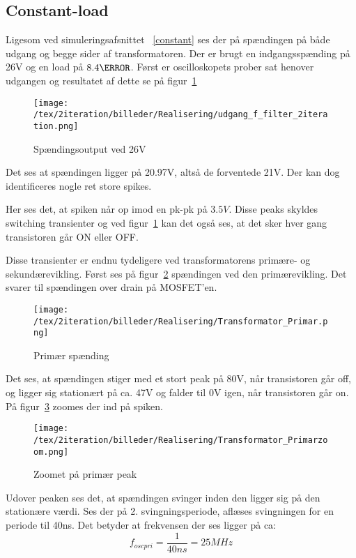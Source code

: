 
\subsection{Constant-load}
\noindent Ligesom ved simuleringsafsnittet ~\ref{constant} ses der på spændingen på både udgang og begge sider af transformatoren. Der er brugt en indgangsspænding på 26V og en load på $8.4\ohm$. 
Først er oscilloskopets prober sat henover udgangen og resultatet af dette se på figur~\ref{fig: Out26V}
\begin{figure}[H]
	\center
	\texttt{[image: /tex/2iteration/billeder/Realisering/udgang\_f\_filter\_2iteration.png]}
	\caption{Spændingsoutput ved 26V}
	\label{fig: Out26V}
\end{figure}
\noindent Det ses at spændingen ligger på 20.97V, altså de forventede 21V. Der kan dog identificeres nogle ret store spikes. 

\noindent Her ses det, at spiken når op imod en pk-pk på $3.5V$. Disse peaks skyldes switching transienter og ved figur~\ref{fig: Out26V} kan det også ses, at det sker hver gang transistoren går ON eller OFF.

\noindent Disse transienter er endnu tydeligere ved transformatorens primære- og sekundærevikling. Først ses på figur~\ref{fig: privolt} spændingen ved den primærevikling. Det svarer til spændingen over drain på MOSFET'en. 
\begin{figure}[H]
	\center
	\texttt{[image: /tex/2iteration/billeder/Realisering/Transformator\_Primar.png]}
	\caption{Primær spænding}
	\label{fig: privolt}
\end{figure}
\noindent Det ses, at spændingen stiger med et stort peak på 80V, når transistoren går off, og ligger sig stationært på ca. 47V og falder til 0V igen, når transistoren går on. På figur~\ref{fig: prizoom} zoomes der ind på spiken.
\begin{figure}[H]
	\center
	\texttt{[image: /tex/2iteration/billeder/Realisering/Transformator\_Primarzoom.png]}
	\caption{Zoomet på primær peak}
	\label{fig: prizoom}
\end{figure}
Udover peaken ses det, at spændingen svinger inden den ligger sig på den stationære værdi. Ses der på 2. svingningsperiode, aflæses svingningen for en periode til 40ns. Det betyder at frekvensen der ses ligger på ca:
\begin{equation} \label{svingpri}
f_{oscpri} = \frac{1}{40ns} = 25MHz
\end{equation}

